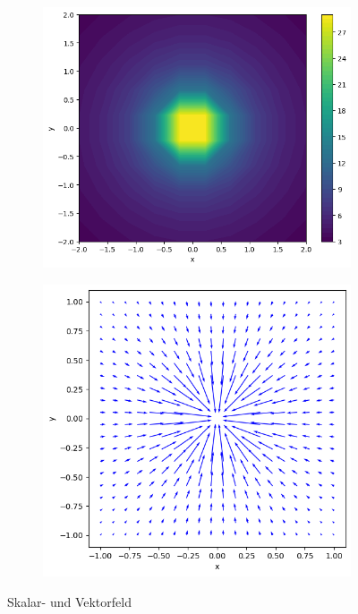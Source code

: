 \begin{figure}
	\centering
	\begin{subfigure}{0.50\textwidth}
	\includegraphics[width=\textwidth]{papers/maxwell/skalar}
	\end{subfigure}
	\begin{subfigure}{0.45\textwidth}
	\includegraphics[width=\textwidth]{papers/maxwell/gradient}
	\end{subfigure}
	\caption{Skalar- und Vektorfeld}
	\label{maxwell:skalarGrad}
\end{figure}

